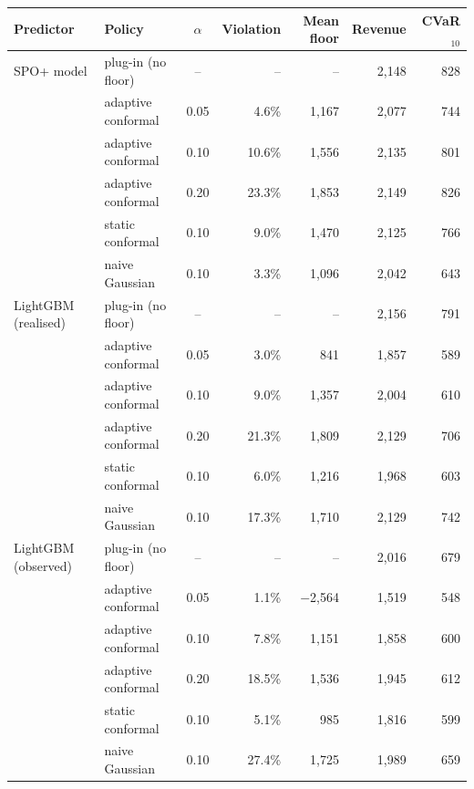 \begin{tabular}{llcrrrr}
\toprule
Predictor & Policy & $\alpha$ & Violation & Mean floor & Revenue & CVaR$_{10}$\\
\midrule
SPO+ model & plug-in (no floor) & -- & -- & -- & 2{,}148 & 828\\
 & adaptive conformal & 0.05 & 4.6\% & 1{,}167 & 2{,}077 & 744\\
 & adaptive conformal & 0.10 & 10.6\% & 1{,}556 & 2{,}135 & 801\\
 & adaptive conformal & 0.20 & 23.3\% & 1{,}853 & 2{,}149 & 826\\
 & static conformal & 0.10 & 9.0\% & 1{,}470 & 2{,}125 & 766\\
 & naive Gaussian & 0.10 & 3.3\% & 1{,}096 & 2{,}042 & 643\\
\midrule
LightGBM (realised) & plug-in (no floor) & -- & -- & -- & 2{,}156 & 791\\
 & adaptive conformal & 0.05 & 3.0\% & 841 & 1{,}857 & 589\\
 & adaptive conformal & 0.10 & 9.0\% & 1{,}357 & 2{,}004 & 610\\
 & adaptive conformal & 0.20 & 21.3\% & 1{,}809 & 2{,}129 & 706\\
 & static conformal & 0.10 & 6.0\% & 1{,}216 & 1{,}968 & 603\\
 & naive Gaussian & 0.10 & 17.3\% & 1{,}710 & 2{,}129 & 742\\
\midrule
LightGBM (observed) & plug-in (no floor) & -- & -- & -- & 2{,}016 & 679\\
 & adaptive conformal & 0.05 & 1.1\% & $-$2{,}564 & 1{,}519 & 548\\
 & adaptive conformal & 0.10 & 7.8\% & 1{,}151 & 1{,}858 & 600\\
 & adaptive conformal & 0.20 & 18.5\% & 1{,}536 & 1{,}945 & 612\\
 & static conformal & 0.10 & 5.1\% & 985 & 1{,}816 & 599\\
 & naive Gaussian & 0.10 & 27.4\% & 1{,}725 & 1{,}989 & 659\\
\bottomrule
\end{tabular}